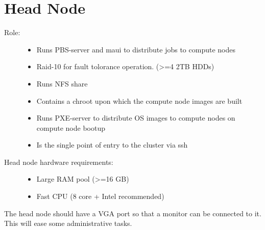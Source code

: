 \documentclass[letterpaper,10pt,english]{sphinxmanual}
\begin{document}
\section{Head Node}
\label{setup:head-node}\begin{description}
\item[{Role:}] \leavevmode\begin{itemize}
\item {} 
Runs PBS-server and maui to distribute jobs to compute nodes

\item {} 
Raid-10 for fault tolorance operation. (\textgreater{}=4 2TB HDDs)

\item {} 
Runs NFS share

\item {} 
Contains a chroot upon which the compute node images are built

\item {} 
Runs PXE-server to distribute OS images to compute nodes on compute node bootup

\item {} 
Is the single point of entry to the cluster via ssh

\end{itemize}

\item[{Head node hardware requirements:}] \leavevmode\begin{itemize}
\item {} 
Large RAM pool (\textgreater{}=16 GB)

\item {} 
Fast CPU (8 core + Intel recommended)

\end{itemize}

\end{description}

The head node should have a VGA port so that a monitor can be connected to it.
This will ease some administrative tasks.
\end{document}
